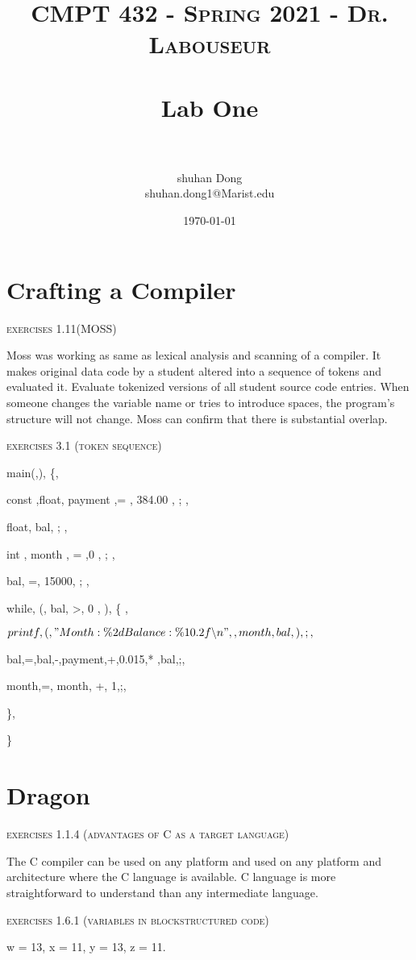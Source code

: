 \documentclass[letterpaper, 10pt,DIV=13]{scrartcl}
\title{	
   \normalfont \normalsize 
   \textsc{CMPT 432 - Spring 2021 - Dr. Labouseur} \\[10pt] %
   \horrule{0.5pt} \\[0.25cm] 	%
   \huge Lab One  \\     	    %
   \horrule{0.5pt} \\[0.25cm] 	%
}
\author{shuhan Dong \\ \normalsize  shuhan.dong1@Marist.edu}
\date{\normalsize\today} 	%
\numberwithin{equation}{section} %
\numberwithin{figure}{section} %
\numberwithin{table}{section} %
\begin{document}
\maketitle %

\section{Crafting a Compiler}
\textsc{exercises 1.11(MOSS)	}

Moss was working as same as lexical analysis and scanning of a compiler. It makes original data code by a student altered into a sequence of tokens and evaluated it. Evaluate tokenized versions of all student source code entries. When someone changes the variable name or tries to introduce spaces, the program's structure will not change. Moss can confirm that there is substantial overlap.

\textsc{exercises 3.1	(token sequence)}


main(,),
\{,

const ,float, payment ,= , 384.00 , ; ,

float, bal, ; , 

int , month , =  ,0 , ; ,

bal, =, 15000, ; ,

while, (, bal, >, 0 , ), \{ ,

$
printf,(,"Month : \% 2d Balance: \% 10.2f\backslash n",, month, bal, ), ; ,
$


bal,=,bal,-,payment,+,0.015,* ,bal,;, 

month,=, month, +, 1,;,

\},

\}

\section{Dragon}

\textsc{exercises	1.1.4		(advantages	of	C as a target language) }

The C compiler can be used on any platform and used on any platform and architecture where the C language is available. C language is more straightforward to understand than any intermediate language.

\textsc{exercises 1.6.1	(variables	in	blockstructured	code)}

w = 13, x = 11, y = 13, z = 11.
\end{document}
